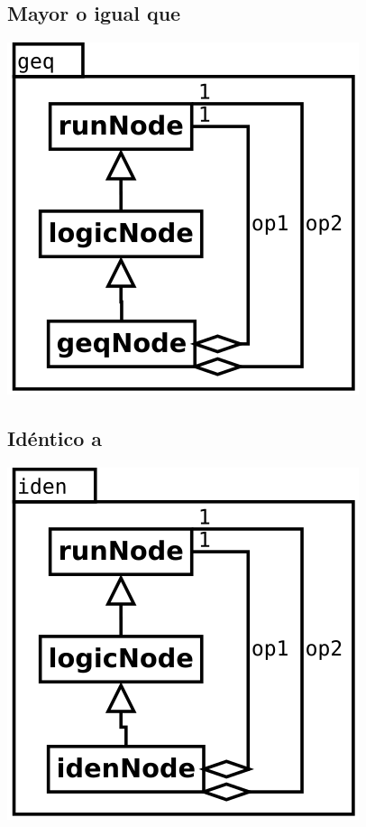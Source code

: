 \subsection {Mayor o igual que}
\begin{center}
\includegraphics[scale=0.4]{geq.png} \\
\end{center}


\subsection {Idéntico a}
\begin{center}
\includegraphics[scale=0.4]{iden.png} \\
\end{center}

